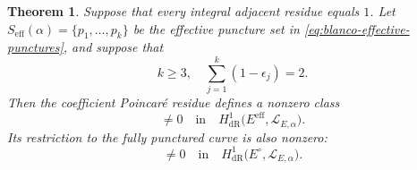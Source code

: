 \documentclass[12pt]{amsart}
\numberwithin{equation}{section}
\theoremstyle{plain}
\newtheorem{theorem}{Theorem}[section]
\theoremstyle{definition}
\theoremstyle{remark}
\theoremstyle{definition}
\newcommand{\Lcal}{\mathscr L}
\begin{document}
\begin{theorem}\label{thm:blanco-residue-class}
Suppose that every integral adjacent residue equals $1$. Let $S_{\mathrm{eff}}(\alpha)=\{p_1,\ldots,p_k\}$ be the effective puncture set in \eqref{eq:blanco-effective-punctures}, and suppose that
\begin{equation*}
k\geq3,
 \quad
 \sum_{j=1}^k(1-\epsilon_j)=2.
\end{equation*}
Then the coefficient Poincar\'e residue defines a nonzero class
\begin{equation*}
[R_{E,\alpha}]
 \neq0
 \quad\text{in}\quad
 H^1_{\mathrm{dR}}
 \bigl(E^{\mathrm{eff}},\Lcal_{E,\alpha}\bigr).
\end{equation*}
Its restriction to the fully punctured curve is also nonzero:
\begin{equation*}
[R_{E,\alpha}]
 \neq0
 \quad\text{in}\quad
 H^1_{\mathrm{dR}}
 \bigl(E^\circ,\Lcal_{E,\alpha}\bigr).
\end{equation*}
\end{theorem}
\end{document}

